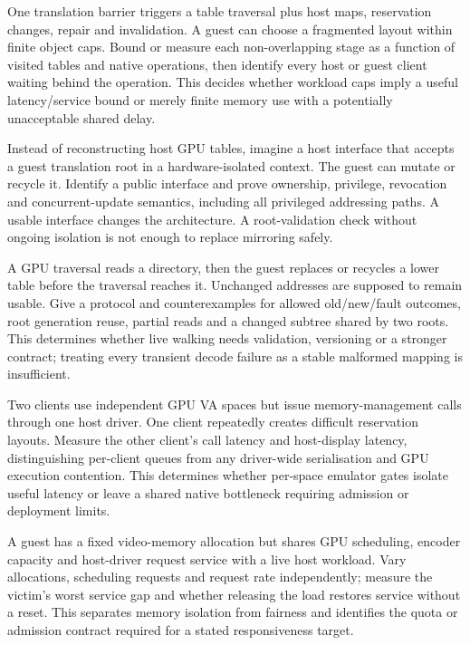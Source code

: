 {One translation barrier triggers a table traversal plus host maps, reservation changes, repair
and invalidation. A guest can choose a fragmented layout within finite object caps.}
{Bound or measure each non-overlapping stage as a function of visited tables and native
operations, then identify every host or guest client waiting behind the operation.}
{This decides whether workload caps imply a useful latency/service bound or merely finite memory
use with a potentially unacceptable shared delay.}
\label{q:worst}

{Instead of reconstructing host GPU tables, imagine a host interface that accepts a guest
translation root in a hardware-isolated context. The guest can mutate or recycle it.}
{Identify a public interface and prove ownership, privilege, revocation and concurrent-update
semantics, including all privileged addressing paths.}
{A usable interface changes the architecture. A root-validation check without ongoing isolation is
not enough to replace mirroring safely.}
\label{q:adopt}

{A GPU traversal reads a directory, then the guest replaces or recycles a lower table before the
traversal reaches it. Unchanged addresses are supposed to remain usable.}
{Give a protocol and counterexamples for allowed old/new/fault outcomes, root generation reuse,
partial reads and a changed subtree shared by two roots.}
{This determines whether live walking needs validation, versioning or a stronger contract;
treating every transient decode failure as a stable malformed mapping is insufficient.}
\label{q:race}

{Two clients use independent GPU VA spaces but issue memory-management calls through one host
driver. One client repeatedly creates difficult reservation layouts.}
{Measure the other client's call latency and host-display latency, distinguishing per-client
queues from any driver-wide serialisation and GPU execution contention.}
{This determines whether per-space emulator gates isolate useful latency or leave a shared native
bottleneck requiring admission or deployment limits.}
\label{q:global}

{A guest has a fixed video-memory allocation but shares GPU scheduling, encoder capacity and
host-driver request service with a live host workload.}
{Vary allocations, scheduling requests and request rate independently; measure the victim's worst
service gap and whether releasing the load restores service without a reset.}
{This separates memory isolation from fairness and identifies the quota or admission contract
required for a stated responsiveness target.}
\label{q:quota}


